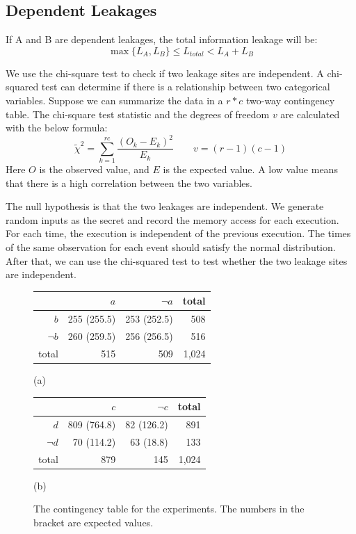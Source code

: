 \subsection{Dependent Leakages}
If A and B are dependent leakages, the total information leakage will be:
\[\max{\{L_A, L_B\}}  \leq L_{\mathit{total}} < L_A + L_B\]

We use the chi-square test to check if two leakage sites are independent. A chi-squared test can determine if there is a relationship between two categorical variables. Suppose we can summarize the data in a $r*c$  two-way contingency table. The chi-square test statistic and the degrees of freedom $v$ are calculated with the below formula:
\[\tilde{\chi}^2=\sum_{k=1}^{rc} \frac{(O_k - E_k)^2}{E_k} \qquad	 v = (r - 1)(c - 1)\]
Here $O$ is the observed value, and $E$ is the expected value. A low value means that there is a high correlation between the two variables. 

The null hypothesis is that the two leakages are independent.
We generate random inputs as the secret and record the memory access for each execution. For each time, the execution is independent of the previous execution. The times of the same observation for each event should satisfy the normal distribution. After that, we can use the chi-squared test to test whether the two leakage sites are independent.

\begin{figure}[h]
  \begin{minipage}{0.40\linewidth}
      \begin{tabular}{rrrr}
        \toprule
        & $a$ & $\lnot a$  & total\\
        \midrule
        $b$   & 255 (255.5) & 253 (252.5) &   508  \\
        $\lnot b$   & 260 (259.5)  & 256 (256.5) &    516   \\
        total &   515 &  509   & 1,024   \\
        \bottomrule
      \end{tabular}\caption*{(a)}
  \end{minipage}
\hspace{-15pt}
\hfill
\hspace{-15pt}
  \begin{minipage}{0.40\linewidth}
      \begin{tabular}{rrrr}
        \toprule
        & $c$ & $\lnot c$  & total\\
        \midrule
        $d$   & 809 (764.8) & 82 (126.2) & 891    \\
        $\lnot d$   & 70 (114.2)  & 63 (18.8)&  133     \\
        total &  879 &  145  & 1,024    \\
        \bottomrule
      \end{tabular}\caption*{(b)}
  \end{minipage}
  \caption{The contingency table for the experiments. The numbers in the bracket are expected values. }\label{chapter5:fig:con_table}
\end{figure}


